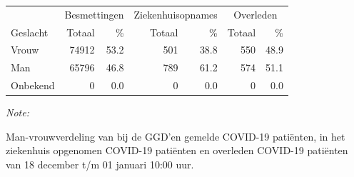 \documentclass[
  english,
  man,floatsintext]{apa6}
\begin{document}
\begin{table}[H]
\centering\begingroup\fontsize{11}{13}\selectfont

\begin{threeparttable}
\begin{tabular}{lrrrrrr}
\toprule
\multicolumn{1}{c}{ } & \multicolumn{2}{c}{Besmettingen} & \multicolumn{2}{c}{Ziekenhuisopnames} & \multicolumn{2}{c}{Overleden} \\
\cmidrule(l{3pt}r{3pt}){2-3} \cmidrule(l{3pt}r{3pt}){4-5} \cmidrule(l{3pt}r{3pt}){6-7}
Geslacht & Totaal & \% & Totaal & \% & Totaal & \%\\
\midrule
Vrouw & 74912 & 53.2 & 501 & 38.8 & 550 & 48.9\\
Man & 65796 & 46.8 & 789 & 61.2 & 574 & 51.1\\
Onbekend & 0 & 0.0 & 0 & 0.0 & 0 & 0.0\\
\bottomrule
\end{tabular}
\begin{tablenotes}
\item \textit{Note: } 
\item Man-vrouwverdeling van bij de GGD’en gemelde COVID-19 patiënten, in het ziekenhuis opgenomen COVID-19 patiënten en overleden COVID-19 patiënten van 18 december t/m 01 januari 10:00 uur.
\end{tablenotes}
\end{threeparttable}
\endgroup{}
\end{table}
\newpage
\end{document}
